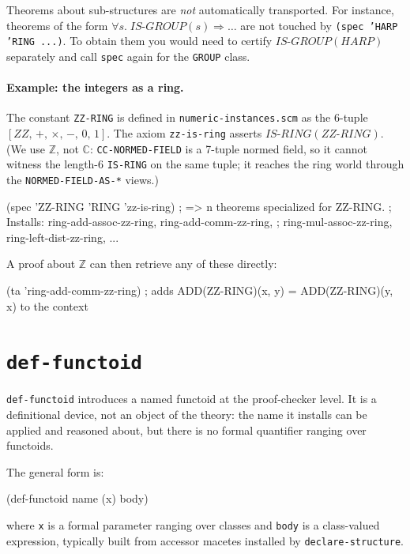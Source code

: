 \begin{remark}
Theorems about sub-structures are \emph{not} automatically transported.
For instance, theorems of the form
$\forall s.\;\mathit{IS\text{-}GROUP}(s)\Rightarrow\ldots$
are not touched by \texttt{(spec 'HARP 'RING ...)}.  To obtain them you
would need to certify $\mathit{IS\text{-}GROUP}(\mathit{HARP})$ separately
and call \texttt{spec} again for the \texttt{GROUP} class.
\end{remark}

\paragraph{Example: the integers as a ring.}
The constant \texttt{ZZ-RING} is defined in \texttt{numeric-instances.scm} as
the 6-tuple $[\mathit{ZZ},\,+,\,\times,\,-,\,0,\,1]$.  The axiom
\texttt{zz-is-ring} asserts $\mathit{IS\text{-}RING}(\mathit{ZZ\text{-}RING})$.
(We use $\mathbb{Z}$, not $\mathbb{C}$: \texttt{CC-NORMED-FIELD} is a 7-tuple normed
field, so it cannot witness the length-6 \texttt{IS-RING} on the same tuple;
it reaches the ring world through the \texttt{NORMED-FIELD-AS-*} views.)

\begin{VNBcode}
(spec 'ZZ-RING 'RING 'zz-is-ring)
; => n theorems specialized for ZZ-RING.
; Installs: ring-add-assoc-zz-ring, ring-add-comm-zz-ring,
;           ring-mul-assoc-zz-ring, ring-left-dist-zz-ring, ...
\end{VNBcode}

A proof about $\mathbb{Z}$ can then retrieve any of these directly:
\begin{VNBcode}
(ta 'ring-add-comm-zz-ring)
; adds  ADD(ZZ-RING)(x, y) = ADD(ZZ-RING)(y, x)  to the context
\end{VNBcode}

\section{\texttt{def-functoid}}
\label{sec:def-functoid}

\texttt{def-functoid} introduces a named functoid at the proof-checker
level.  It is a definitional device, not an object of the theory: the
name it installs can be applied and reasoned about, but there is no
formal quantifier ranging over functoids.

The general form is:
\begin{VNBcode}
(def-functoid name (x) body)
\end{VNBcode}
where \texttt{x} is a formal parameter ranging over classes and
\texttt{body} is a class-valued expression, typically built from
accessor macetes installed by \texttt{declare-structure}.


